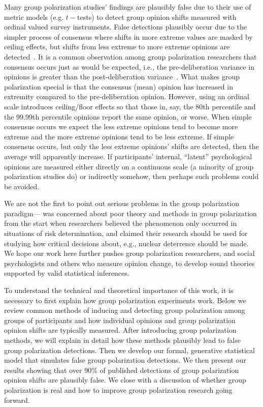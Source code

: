 Many group polarization studies' findings are plausibly false due to their
use of metric models (e.g. $t-$tests) to detect group opinion shifts measured with ordinal valued
survey instruments. False detections plausibly occur due to the simpler process of consensus where
shifts in more extreme values are masked by ceiling effects, but shifts
from less extreme to more extreme opinions are detected~\cite{Liddell2018}. 
It is a common observation among group polarization researchers
that consensus occurs just as would be expected, i.e., the pre-deliberation
variance in opinions is greater than the post-deliberation variance~\cite{Asch1951,Asch1955,French1956,DeGroot1974}.
What makes group polarization special is that the consensus (mean) opinion
has increased in extremity compared to the pre-deliberation opinion.
However, using an ordinal scale introduces ceiling/floor effects so that 
those in, say, the 80th percentile and the 99.99th percentile opinions
report the same opinion, or worse. When simple consensus occurs we 
expect the less extreme opinions tend to become more extreme and the more extreme opinions tend to
be less extreme.  If simple consensus occurs, but only the less extreme opinions' shifts are detected, 
then the average will apparently increase. If 
participants' internal, ``latent'' psychological opinions are measured either
directly on a continuous scale (a minority of group polarization studies do) 
or indirectly somehow, then perhaps such problems could be avoided. 

We are not the
first to point out serious problems in the group polarization paradigm--- 
was concerned about poor theory and methods in group polarization from the start
when researchers believed the phenomenon only occurred in situations of
risk determination, and claimed their research should be used for studying
how critical decisions about, e.g., nuclear deterrence should be made. We
hope our work here further pushes group polarization researchers, and
social psychologists and others who measure opinion change, to develop sound
theories supported by valid statistical inferences.

To understand the technical and theoretical importance of this work, it is
necessary to first explain how group polarization experiments work.
Below we review 
common methods of inducing and detecting group polarization among groups 
of participants and how individual opinions and group polarization opinion shifts 
are typically measured.  
After introducing group polarization methods, 
we will explain in detail how these
methods plausibly lead to false group polarization detections.
Then we develop our
formal, generative statistical model that simulates false group polarization
detections. We then present our results
showing that over 90\% of published detections of group polarization
opinion shifts are plausibly false. We close with a discussion of whether
group polarization is real and how to improve group polarization research going 
forward.


